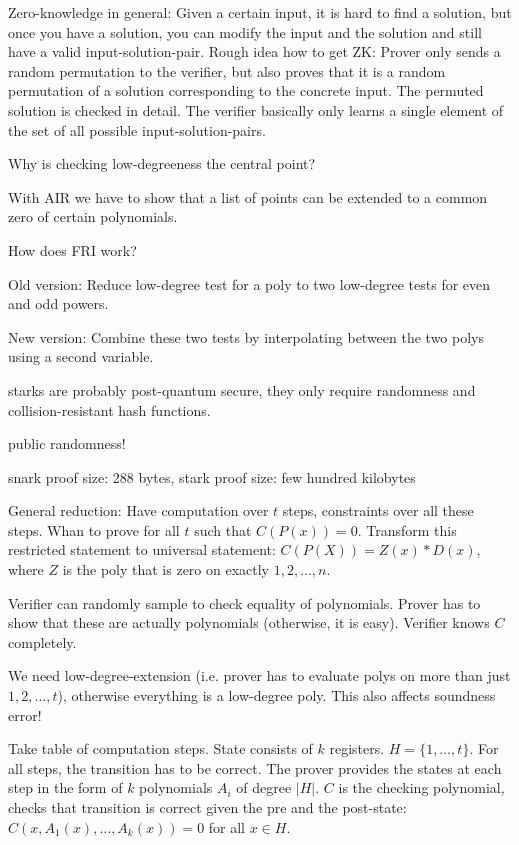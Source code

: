 \documentclass[11pt,letterpaper]{article}
\begin{document}
Zero-knowledge in general: Given a certain input, it is hard to find a solution, but once you have a solution, you
can modify the input and the solution and still have a valid input-solution-pair. Rough idea how to get ZK:
Prover only sends a random permutation to the verifier, but also proves that it is a random permutation of a solution
corresponding to the concrete input. The permuted solution is checked in detail. The verifier basically only learns
a single element of the set of all possible input-solution-pairs.

Why is checking low-degreeness the central point?

With AIR we have to show that a list of points can be extended to a common zero of certain polynomials.

How does FRI work?

Old version: Reduce low-degree test for a poly to two low-degree tests for even and odd powers.

New version: Combine these two tests by interpolating between the two polys using a second variable.

starks are probably post-quantum secure, they only require randomness and collision-resistant hash functions.

public randomness!

snark proof size: 288 bytes, stark proof size: few hundred kilobytes


General reduction: Have computation over $t$ steps, constraints over all these steps. Whan to prove for all $t$
such that $C(P(x)) = 0$. Transform this restricted statement to universal statement: $C(P(X)) = Z(x)*D(x)$,
where $Z$ is the poly that is zero on exactly $1,2,\dots,n$.

Verifier can randomly sample to check equality of polynomials. Prover has to show that these are actually polynomials
(otherwise, it is easy). Verifier knows $C$ completely.

We need low-degree-extension (i.e. prover has to evaluate polys on more than just $1,2,\dots,t$), otherwise everything is a low-degree poly. This also affects soundness error!


Take table of computation steps. State consists of $k$ registers. $H = \{1,\dots,t\}$. For all steps, the
transition has to be correct.
The prover provides the states
at each step in the form of $k$ polynomials $A_i$ of degree $|H|$. $C$ is the checking polynomial, checks that
transition is correct given
the pre and the post-state: $C(x, A_1(x), \dots, A_k(x)) = 0$ for all $x \in H$.
\end{document}
